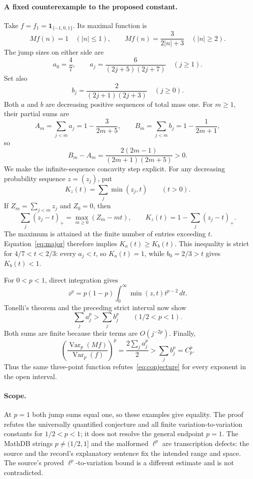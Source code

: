 \documentclass[11pt]{article}
\DeclareMathOperator{\Var}{Var}
\begin{document}
\paragraph{A fixed counterexample to the proposed constant.}
Take \(f=f_1=\mathbf1_{\{-1,0,1\}}\). Its maximal function is
\[
Mf(n)=1\quad(|n|\leq1),\qquad
Mf(n)=\frac3{2|n|+3}\quad(|n|\geq2).
\]
The jump sizes on either side are
\[
a_0=\frac47,\qquad
a_j=\frac6{(2j+5)(2j+7)}\quad(j\geq1).
\]
Set also
\[
b_j=\frac2{(2j+1)(2j+3)}\quad(j\geq0).
\]
Both \(a\) and \(b\) are decreasing positive sequences of total mass
one. For \(m\geq1\), their partial sums are
\[
A_m=\sum_{j<m}a_j=1-\frac3{2m+5},\qquad
B_m=\sum_{j<m}b_j=1-\frac1{2m+1},
\]
so
\begin{equation}\label{eq:major}
B_m-A_m=\frac{2(2m-1)}{(2m+1)(2m+5)}>0.
\end{equation}
We make the infinite-sequence concavity step explicit.
For any decreasing probability sequence \(z=(z_j)\), put
\[
K_z(t)=\sum_j\min(z_j,t)\qquad(t>0).
\]
If \(Z_m=\sum_{j<m}z_j\) and \(Z_0=0\), then
\[
\sum_j(z_j-t)_+=\max_{m\geq0}(Z_m-mt),\qquad
K_z(t)=1-\sum_j(z_j-t)_+.
\]
The maximum is attained at the finite number of entries exceeding \(t\).
Equation~\eqref{eq:major} therefore implies \(K_a(t)\geq K_b(t)\).
This inequality is strict for \(4/7<t<2/3\): every \(a_j<t\), so
\(K_a(t)=1\), while \(b_0=2/3>t\) gives \(K_b(t)<1\).

For \(0<p<1\), direct integration gives
\[
z^p=p(1-p)\int_0^\infty \min(z,t)t^{p-2}\,dt.
\]
Tonelli's theorem and the preceding strict interval now show
\[
\sum_j a_j^p>\sum_j b_j^p\qquad(1/2<p<1).
\]
Both sums are finite because their terms are \(O(j^{-2p})\).
Finally,
\[
\left(\frac{\Var_p(Mf)}{\Var_p(f)}\right)^p
=\frac{2\sum_ja_j^p}{2}
>\sum_jb_j^p=C_p^p.
\]
Thus the same three-point function refutes~\eqref{eq:conjecture}
for every exponent in the open interval.

\paragraph{Scope.}
At \(p=1\) both jump sums equal one, so these examples give equality.
The proof refutes the universally quantified conjecture and all finite
variation-to-variation constants for \(1/2<p<1\); it does not resolve
the general endpoint \(p=1\).
The MathDB strings \(p\ne(1/2,1]\) and the malformed \(\ell^p\)
are transcription defects: the source and the record's explanatory
sentence fix the intended range and space.
The source's proved \(\ell^p\)-to-variation bound is a different estimate
and is not contradicted.
\end{document}
